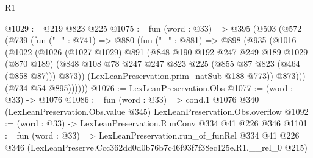 \begin{lexlean}{R1}
\begin{coremodule}
@1029 := @219 @823 @225
@1075 := fun (word : @33) =>
  @395
    (@503
      (@572
        (@739
          (fun ("_" : @741) =>
          @880
            (fun ("_" : @881) =>
            @898
              (@935
                (@1016
                  (@1022
                    (@1026
                      (@1027 @1029)
                      @891
                      (@848
                        @190
                        @192
                        @247
                        @249
                        @189
                        @1029
                        (@870 @189)
                        (@848 @108 @78 @247 @247 @823 @225 (@855 @87 @823 (@464 (@858 @87))) @873))
                      (LexLeanPreservation.prim_natSub @188 @773))
                    @873)))
              (@734 @54 @895))))))
@1076 := LexLeanPreservation.Obs
@1077 := (word : @33) -> @1076
@1086 := fun (word : @33) =>
  cond.{1} @1076 @340 (LexLeanPreservation.Obs.value @345) LexLeanPreservation.Obs.overflow
@1092 := (word : @33) -> LexLeanPreservation.RunConv @334 @41 @226 @346
@1101 := fun (word : @33) =>
  LexLeanPreservation.run_of_funRel
    @334
    @41
    @226
    @346
    (LexLeanPreserve.Ccc362dd0d0b76b7c46f93f7f38ec125e.R1.__rel_0 @215)
\end{coremodule}
\end{lexlean}
